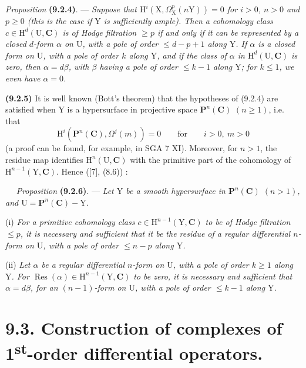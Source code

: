 \documentclass[11pt,leqno]{article}
\newcommand{\Page}[1]{\ifvmode\noindent\else\unskip\ \fi{\footnotesize\textcolor{gray}{[p.\,#1]}}\ \ignorespaces}
\begin{document}
\textit{Proposition} \textbf{(9.2.4)}. — \textit{Suppose that \(\mathrm{H}^{i}(\mathrm{X},\Omega_{\mathrm{X}}^{p}(n\mathrm{Y}))=0\) for \(i>0\), \(n>0\) and \(p\geq0\) (this is the case if \(\mathrm{Y}\) is sufficiently ample). Then a cohomology class \(c\in\mathrm{H}^{d}(\mathrm{U},\mathbf{C})\) is of Hodge filtration \(\geq p\) if and only if it can be represented by a closed \(d\)-form \(\alpha\) on \(\mathrm{U}\), with a pole of order \(\leq d-p+1\) along \(\mathrm{Y}\). If \(\alpha\) is a closed form on \(\mathrm{U}\), with a pole of order \(k\) along \(\mathrm{Y}\), and if the class of \(\alpha\) in \(\mathrm{H}^{d}(\mathrm{U},\mathbf{C})\) is zero, then \(\alpha=d\beta\), with \(\beta\) having a pole of order \(\leq k-1\) along \(\mathrm{Y}\); for \(k\leq1\), we even have \(\alpha=0\).}

\textbf{(9.2.5)} It is well known (Bott’s theorem) that the hypotheses of (9.2.4) are satisfied when \(\mathrm{Y}\) is a hypersurface in projective space \(\mathbf{P}^{n}(\mathbf{C})\) \((n\geq1)\), i.e. that
\[
\mathrm{H}^{i}(\mathbf{P}^{n}(\mathbf{C}),\Omega^{j}(m))=0
\qquad\text{for}\qquad i>0,\ m>0
\]
(a proof can be found, for example, in SGA 7 XI). Moreover, for \(n>1\), the residue map identifies \(\mathrm{H}^{n}(\mathrm{U},\mathbf{C})\) with the primitive part of the cohomology of \(\mathrm{H}^{n-1}(\mathrm{Y},\mathbf{C})\). Hence ([7], (8.6)) :

\Page{50}
\textit{Proposition} \textbf{(9.2.6)}. — \textit{Let \(\mathrm{Y}\) be a smooth hypersurface in \(\mathbf{P}^{n}(\mathbf{C})\) \((n>1)\), and \(\mathrm{U}=\mathbf{P}^{n}(\mathbf{C})-\mathrm{Y}\).}

(i) \textit{For a primitive cohomology class \(c\in\mathrm{H}^{n-1}(\mathrm{Y},\mathbf{C})\) to be of Hodge filtration \(\leq p\), it is necessary and sufficient that it be the residue of a regular differential \(n\)-form on \(\mathrm{U}\), with a pole of order \(\leq n-p\) along \(\mathrm{Y}\).}

(ii) \textit{Let \(\alpha\) be a regular differential \(n\)-form on \(\mathrm{U}\), with a pole of order \(k\geq1\) along \(\mathrm{Y}\). For \(\operatorname{Res}(\alpha)\in\mathrm{H}^{n-1}(\mathrm{Y},\mathbf{C})\) to be zero, it is necessary and sufficient that \(\alpha=d\beta\), for an \((n-1)\)-form on \(\mathrm{U}\), with a pole of order \(\leq k-1\) along \(\mathrm{Y}\).}

\section*{9.3. Construction of complexes of 1\textsuperscript{st}-order differential operators.}
\end{document}
